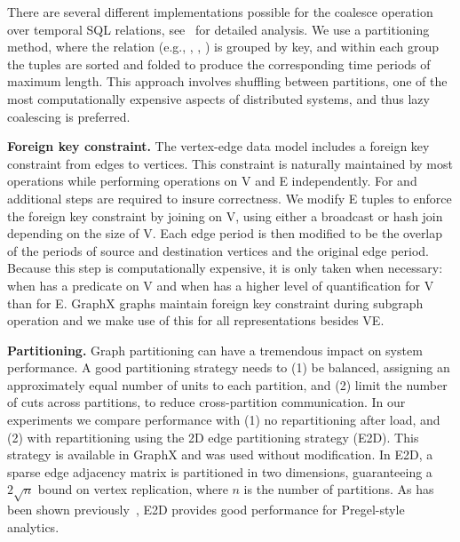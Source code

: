 
There are several different implementations possible for the coalesce
operation over temporal SQL relations,
see~\cite{DBLP:conf/vldb/BohlenSS96} for detailed analysis.  We use a
partitioning method, where the relation (e.g., \tv, \te, \trg) is
grouped by key, and within each group the tuples are sorted and folded
to produce the corresponding time periods of maximum length.  This
approach involves shuffling between partitions, one of the most
computationally expensive aspects of distributed systems, and thus
lazy coalescing is preferred.

{\bf Foreign key constraint.} 
The vertex-edge data model includes a foreign key constraint from
edges to vertices.  This constraint is naturally maintained by most
operations while performing operations on V and E independently.  For
 and  additional steps are required to
insure correctness.  We modify E tuples to enforce the foreign key
constraint by joining on V, using either a broadcast or hash join
depending on the size of V.  Each edge period is then modified to be
the overlap of the periods of source and destination vertices and the
original edge period.  Because this step is computationally expensive,
it is only taken when necessary: when  has a predicate
on V and when  has a higher level of quantification
for V than for E.  GraphX graphs maintain foreign key constraint
during subgraph operation and we make use of this for all
representations besides VE.

{\bf Partitioning.}  Graph partitioning can have a tremendous impact
on system performance.  A good partitioning strategy needs to (1) be
balanced, assigning an approximately equal number of units to each
partition, and (2) limit the number of cuts across partitions, to
reduce cross-partition communication.  In our experiments we compare
performance with (1) no repartitioning after load, and (2) with
repartitioning using the 2D edge partitioning strategy (E2D).  This
strategy is available in GraphX and was used without modification.  In
E2D, a sparse edge adjacency matrix is partitioned in two dimensions,
guaranteeing a $2 \sqrt{n}$ bound on vertex replication, where $n$ is
the number of partitions. As has been shown
previously~\cite{DBLP:conf/osdi/GonzalezXDCFS14,MoffittTempWeb16}, E2D
provides good performance for Pregel-style analytics.

